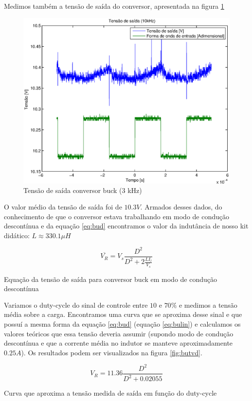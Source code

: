 \documentclass{article}
\begin{document}
Medimos também a tensão de saída do conversor, apresentada na figura \ref{fig:but3k}
\begin{figure}[H]
	\centering
	\includegraphics[width=0.5\linewidth]{Dados/buck/t3k}
	\caption{Tensão de saída conversor buck (3 kHz)}
	\label{fig:but3k}
\end{figure}

O valor médio da tensão de saída foi de $10.3 V$. Armados desses dados, do conhecimento de que o conversor estava trabalhando em modo de condução descontínua e da equação \ref{eq:bud} encontramos o valor da indutância de nosso kit didático: $L \approx 330.1 \mu H$

\begin{capequ}
	\begin{equation}
	\overline{V_R} = V_s\frac{D^2}{D^2 + 2\frac{LI_l}{V_s}}
	\end{equation}
	\caption{Equação da tensão de saída para conversor buck em modo de condução descontínua}
	\label{eq:bud}
\end{capequ}

Variamos o duty-cycle do sinal de controle entre $10$ e $70\%$ e medimos a tensão média sobre a carga. Encontramos uma curva que se aproxima desse sinal e que possuí a mesma forma da equação \ref{eq:bud} (equação \ref{eq:bulin}) e calculamos os valores teóricos que essa tensão deveria assumir (supondo modo de condução descontínua e que a corrente média no indutor se manteve aproximadamente $0.25 A$). Os resultados podem ser visualizados na figura \ref{fig:butvd}.

\begin{capequ}
	\begin{equation}
	V_R = 11.36\frac{D^2}{D^2 +  0.02055}	
	\end{equation}
	\caption{Curva que aproxima a tensão medida de saída em função do duty-cycle}
	\label{eq:bulin}
\end{capequ}
\end{document}
